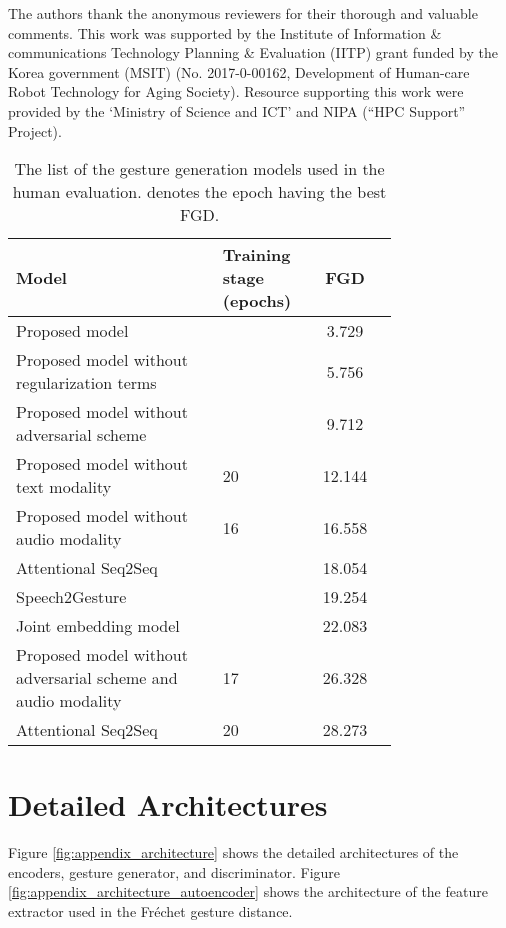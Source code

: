 \documentclass[acmtog]{acmart}
\begin{document}
\begin{acks}
The authors thank the anonymous reviewers for their thorough and valuable comments. This work was supported by the Institute of Information \& communications Technology Planning \& Evaluation (IITP) grant funded by the Korea government (MSIT) (No. 2017-0-00162, Development of Human-care Robot Technology for Aging Society). Resource supporting this work were provided by the `Ministry of Science and ICT' and NIPA (``HPC Support'' Project).
\end{acks} 



\appendix

\begin{table}
\caption{The list of the gesture generation models used in the human evaluation.  denotes the epoch having the best FGD.}
\label{tab:ut_models}
\centering
\begin{tabular}{p{0.54\linewidth}p{0.22\linewidth}S}
  \toprule
  Model & Training stage (epochs) & {FGD}\\ 
  \midrule
Proposed model &  & 3.729\\
Proposed model without regularization terms &  & 5.756\\
Proposed model without adversarial scheme &  & 9.712\\
Proposed model without text modality & 20 & 12.144\\
Proposed model without audio modality & 16 & 16.558\\
Attentional Seq2Seq &  & 18.054\\
Speech2Gesture &  & 19.254\\
Joint embedding model &  & 22.083\\
Proposed model without adversarial scheme and audio modality & 17 & 26.328\\
Attentional Seq2Seq & 20 & 28.273\\
  \bottomrule
\end{tabular}
\end{table}

\section{Detailed Architectures} \label{sec:detailedarch}

Figure \ref{fig:appendix_architecture} shows the detailed architectures of the encoders, gesture generator, and discriminator. Figure \ref{fig:appendix_architecture_autoencoder} shows the architecture of the feature extractor used in the Fr\'{e}chet gesture distance.
\end{document}
